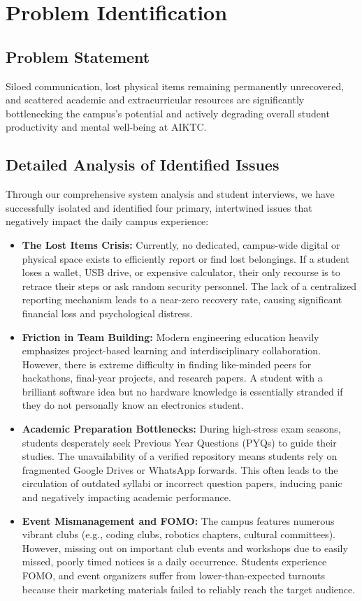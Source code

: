\chapter{Problem Identification}

\section{Problem Statement}
Siloed communication, lost physical items remaining permanently unrecovered, and scattered academic and extracurricular resources are significantly bottlenecking the campus's potential and actively degrading overall student productivity and mental well-being at AIKTC.

\section{Detailed Analysis of Identified Issues}
Through our comprehensive system analysis and student interviews, we have successfully isolated and identified four primary, intertwined issues that negatively impact the daily campus experience:

\begin{itemize}
    \item \textbf{The Lost Items Crisis:} Currently, no dedicated, campus-wide digital or physical space exists to efficiently report or find lost belongings. If a student loses a wallet, USB drive, or expensive calculator, their only recourse is to retrace their steps or ask random security personnel. The lack of a centralized reporting mechanism leads to a near-zero recovery rate, causing significant financial loss and psychological distress.
    
    \item \textbf{Friction in Team Building:} Modern engineering education heavily emphasizes project-based learning and interdisciplinary collaboration. However, there is extreme difficulty in finding like-minded peers for hackathons, final-year projects, and research papers. A student with a brilliant software idea but no hardware knowledge is essentially stranded if they do not personally know an electronics student.
    
    \item \textbf{Academic Preparation Bottlenecks:} During high-stress exam seasons, students desperately seek Previous Year Questions (PYQs) to guide their studies. The unavailability of a verified repository means students rely on fragmented Google Drives or WhatsApp forwards. This often leads to the circulation of outdated syllabi or incorrect question papers, inducing panic and negatively impacting academic performance.
    
    \item \textbf{Event Mismanagement and FOMO:} The campus features numerous vibrant clubs (e.g., coding clubs, robotics chapters, cultural committees). However, missing out on important club events and workshops due to easily missed, poorly timed notices is a daily occurrence. Students experience FOMO, and event organizers suffer from lower-than-expected turnouts because their marketing materials failed to reliably reach the target audience.
\end{itemize}

